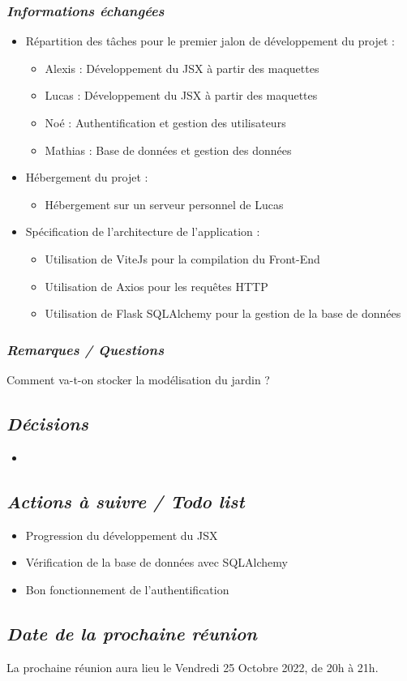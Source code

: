 \documentclass[french,a4paper]{article}
\begin{document}
\subsubsection*{\textit{Informations échangées}}
\begin{itemize}
  \item Répartition des tâches pour le premier jalon de développement du projet :
    \begin{itemize}
      \item Alexis : Développement du JSX à partir des maquettes
      \item Lucas : Développement du JSX à partir des maquettes
      \item Noé : Authentification et gestion des utilisateurs
      \item Mathias : Base de données et gestion des données 
    \end{itemize}
  \item Hébergement du projet :
    \begin{itemize}
      \item Hébergement sur un serveur personnel de Lucas
    \end{itemize}
  \item  Spécification de l'architecture de l'application :
    \begin{itemize}
      \item Utilisation de ViteJs pour la compilation du Front-End
      \item Utilisation de Axios pour les requêtes HTTP
      \item Utilisation de Flask SQLAlchemy pour la gestion de la base de données 
    \end{itemize}
\end{itemize}
\subsubsection*{\textit{Remarques / Questions}}
Comment va-t-on stocker la modélisation du jardin ?

\subsection*{\textit{Décisions}}
\begin{itemize}
  \item 
\end{itemize}

\subsection*{\textit{Actions à suivre / Todo list}}
\begin{itemize}
  \item Progression du développement du JSX
  \item Vérification de la base de données avec SQLAlchemy
  \item Bon fonctionnement de l'authentification
\end{itemize}

\subsection*{\textit{Date de la prochaine réunion}}
La prochaine réunion aura lieu le Vendredi 25 Octobre 2022, de 20h à 21h.
\end{document}

